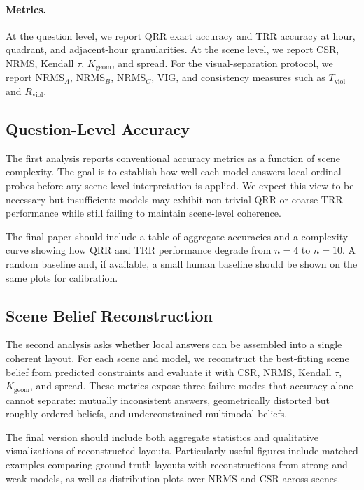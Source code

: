 \paragraph{Metrics.}
At the question level, we report QRR exact accuracy and TRR accuracy at hour, quadrant, and adjacent-hour granularities. At the scene level, we report CSR, NRMS, Kendall $\tau$, $K_{\mathrm{geom}}$, and spread. For the visual-separation protocol, we report $\mathrm{NRMS}_A$, $\mathrm{NRMS}_B$, $\mathrm{NRMS}_C$, VIG, and consistency measures such as $T_{\mathrm{viol}}$ and $R_{\mathrm{viol}}$.

\subsection{Question-Level Accuracy}
\label{sec:exp-accuracy}

The first analysis reports conventional accuracy metrics as a function of scene complexity. The goal is to establish how well each model answers local ordinal probes before any scene-level interpretation is applied. We expect this view to be necessary but insufficient: models may exhibit non-trivial QRR or coarse TRR performance while still failing to maintain scene-level coherence.

The final paper should include a table of aggregate accuracies and a complexity curve showing how QRR and TRR performance degrade from $n=4$ to $n=10$. A random baseline and, if available, a small human baseline should be shown on the same plots for calibration.

\subsection{Scene Belief Reconstruction}
\label{sec:exp-reconstruction}

The second analysis asks whether local answers can be assembled into a single coherent layout. For each scene and model, we reconstruct the best-fitting scene belief from predicted constraints and evaluate it with CSR, NRMS, Kendall $\tau$, $K_{\mathrm{geom}}$, and spread. These metrics expose three failure modes that accuracy alone cannot separate: mutually inconsistent answers, geometrically distorted but roughly ordered beliefs, and underconstrained multimodal beliefs.

The final version should include both aggregate statistics and qualitative visualizations of reconstructed layouts. Particularly useful figures include matched examples comparing ground-truth layouts with reconstructions from strong and weak models, as well as distribution plots over NRMS and CSR across scenes.

